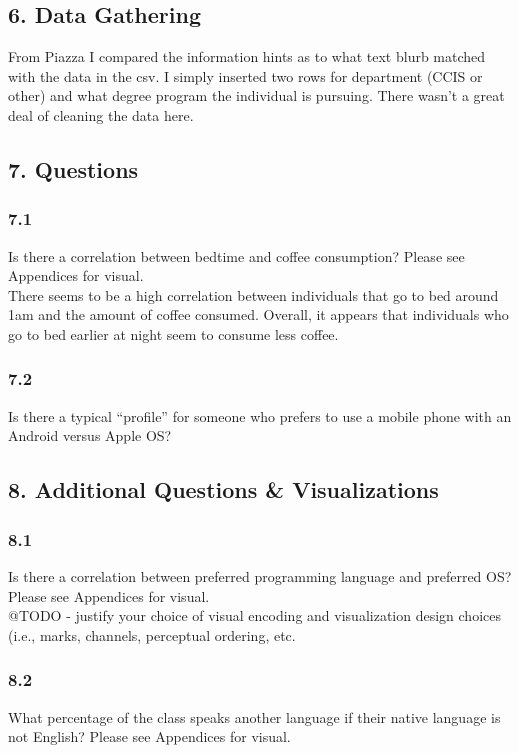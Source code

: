 \documentclass{neu_handout}
\begin{document}
\subsection*{6. Data Gathering}
From Piazza I compared the information hints as to what text blurb matched with the data in the csv. I simply inserted two rows for department (CCIS or other) and what degree program the individual is pursuing. There wasn't a great deal of cleaning the data here.

\subsection*{7. Questions}

\subsubsection*{7.1}
Is there a correlation between bedtime and coffee consumption? Please see Appendices for visual.\\

There seems to be a high correlation between individuals that go to bed around 1am and the amount of coffee consumed. Overall, it appears that individuals who go to bed earlier at night seem to consume less coffee.

\subsubsection*{7.2}
Is there a typical “profile” for someone who prefers to use a mobile phone with an
Android versus Apple OS?

\subsection*{8. Additional Questions & Visualizations}


\subsubsection*{8.1}
Is there a correlation between preferred programming language and preferred OS? Please see Appendices for visual.\\

@TODO - justify your choice of visual encoding and visualization design choices (i.e., marks, channels,
perceptual ordering, etc.

\subsubsection*{8.2}
What percentage of the class speaks another language if their native language is not English? Please see Appendices for visual.\\
\end{document}
